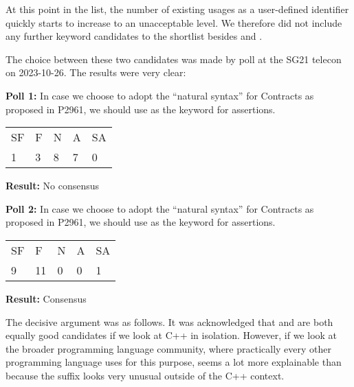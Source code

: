 At this point in the list, the number of existing usages as a user-defined identifier quickly starts to increase to an unacceptable level. We therefore did not include any further keyword candidates to the shortlist besides  and .

The choice between these two candidates was made by poll at the SG21 telecon on 2023-10-26. The results were very clear:



\begin{adjustwidth}{0.5cm}{0.5cm}
\textbf{Poll 1:} In case we choose to adopt the ``natural syntax'' for Contracts as proposed in 
P2961, we should use  as the keyword for assertions.

\begin{tabular}{lllll}
SF & F & N & A & SA \\
1 & 3 & 8 & 7 & 0
\end{tabular}

\textbf{Result:} No consensus
\end{adjustwidth}

\begin{adjustwidth}{0.5cm}{0.5cm}
\textbf{Poll 2:} In case we choose to adopt the ``natural syntax'' for Contracts as proposed in 
P2961, we should use  as the keyword for assertions.

\begin{tabular}{lllll}
SF & F & N & A & SA \\
9 & 11 & 0 & 0 & 1
\end{tabular}

\textbf{Result:} Consensus
\end{adjustwidth}

The decisive argument was as follows. It was acknowledged that  and  are both equally good candidates if we look at C++ in isolation. However, if we look at the broader programming language community, where practically every other programming language uses  for this purpose,  seems a lot more explainable than  because the  suffix looks very unusual outside of the C++ context.


